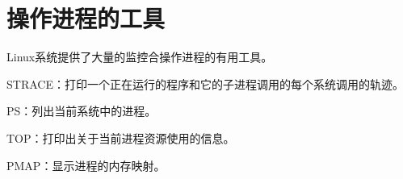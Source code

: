 
\section{操作进程的工具}
{
    Linux系统提供了大量的监控合操作进程的有用工具。

    STRACE：打印一个正在运行的程序和它的子进程调用的每个系统调用的轨迹。

    PS：列出当前系统中的进程。

    TOP：打印出关于当前进程资源使用的信息。

    PMAP：显示进程的内存映射。
}

